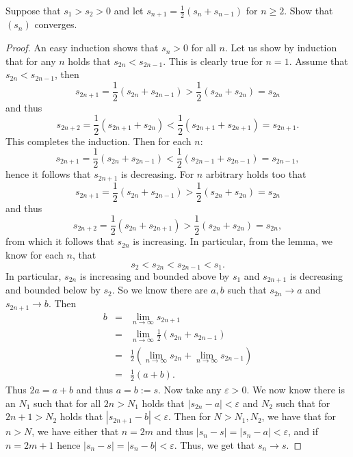 \begin{exercise}{12}
Suppose that $s_1>s_2>0$ and let $s_{n+1} = \frac{1}{2}(s_n + s_{n-1})$ for $n\geq 2$. Show that $(s_n)$ converges.    
\end{exercise}
\begin{proof}
    An easy induction shows that $s_n>0$ for all $n$. Let us show by induction that for any $n$ holds that $s_{2n}<s_{2n-1}$. This is clearly true for $n=1$. Assume that $s_{2n}<s_{2n-1}$, then
    $$s_{2n+1} = \frac{1}{2}(s_{2n} + s_{2n-1}) > \frac{1}{2}(s_{2n} + s_{2n}) = s_{2n}$$
    and thus
    $$s_{2n+2} = \frac{1}{2}(s_{2n+1} + s_{2n}) < \frac{1}{2}(s_{2n+1} + s_{2n+1}) = s_{2n+1}.$$
    This completes the induction. Then for each $n$:
    $$s_{2n+1} = \frac{1}{2}(s_{2n} + s_{2n-1}) < \frac{1}{2}(s_{2n-1} + s_{2n-1}) = s_{2n-1},$$
    hence it follows that $s_{2n+1}$ is decreasing. For $n$ arbitrary holds too that
    $$s_{2n+1} = \frac{1}{2}(s_{2n} + s_{2n-1}) > \frac{1}{2}(s_{2n} + s_{2n}) = s_{2n}$$
    and thus
    $$s_{2n+2} = \frac{1}{2}(s_{2n} + s_{2n+1}) > \frac{1}{2}(s_{2n} + s_{2n}) = s_{2n},$$
    from which it follows that $s_{2n}$ is increasing. In particular, from the lemma, we know for each $n$, that
    $$s_2< s_{2n}<s_{2n-1} < s_1.$$
    In particular, $s_{2n}$ is increasing and bounded above by $s_1$ and $s_{2n+1}$ is decreasing and bounded below by $s_2$. So we know there are $a,b$ such that $s_{2n}\rightarrow a$ and $s_{2n+1}\rightarrow b$. Then
    \begin{eqnarray*}
        b
        & = & \lim_{n\rightarrow\infty} s_{2n+1}\\
        & = & \lim_{n\rightarrow \infty} \frac{1}{2}(s_{2n} + s_{2n-1})\\
        & = & \frac{1}{2}\left(\lim_{n\rightarrow\infty} s_{2n} + \lim_{n\rightarrow\infty} s_{2n-1}\right)\\
        & = & \frac{1}{2}\left(a+b\right).
    \end{eqnarray*}
    Thus $2a = a+b$ and thus $a=b:=s$. Now take any $\varepsilon>0$. We now know there is an $N_1$ such that for all $2n>N_1$ holds that $|s_{2n} - a|<\varepsilon$ and $N_2$ such that for $2n+1>N_2$ holds that $|s_{2n+1} - b|<\varepsilon$. Then for $N > N_1,N_2$, we have that for $n>N$, we have either that $n=2m$ and thus $|s_n - s| = |s_n - a|<\varepsilon$, and if $n=2m+1$ hence $|s_n - s| = |s_n - b|<\varepsilon$. Thus, we get that $s_n\rightarrow s$. 
\end{proof}

